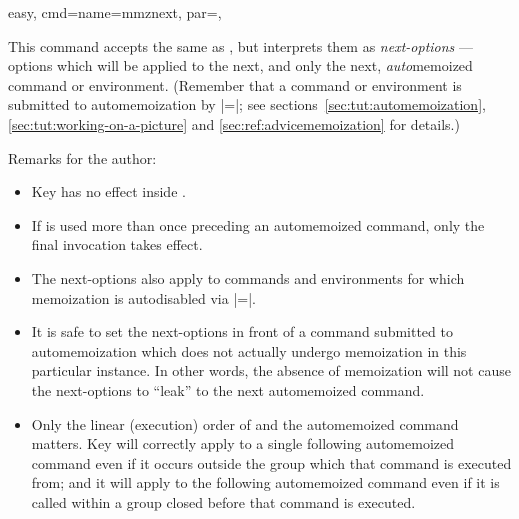 \documentclass[a4paper,11pt]{article}
\begin{document}
\begin{doc}{easy,
    cmd={name=mmznext, par=},
  }

  This command accepts the same  as , but
  interprets them as \emph{next-options} --- options which will be applied to
  the next, and only the next, \emph{auto}memoized command or environment.
  (Remember that a command or environment is submitted to automemoization by
  |=|; see
  sections~\ref{sec:tut:automemoization}, \ref{sec:tut:working-on-a-picture}
  and \ref{sec:ref:advicememoization} for details.)

  Remarks for the author:

  \begin{itemize}
  \item Key  has no effect inside .
  \item If  is used more than once preceding an automemoized
    command, only the final invocation takes effect.
  \item The next-options also apply to commands and environments for which
    memoization is autodisabled via |=|.
  \item It is safe to set the next-options in front of a command submitted to
    automemoization which does not actually undergo memoization in this
    particular instance.  In other words, the absence of memoization will not
    cause the next-options to ``leak'' to the next automemoized command.
  \item Only the linear (execution) order of  and the
    automemoized command matters.  Key  will correctly apply to
    a single following automemoized command even if it occurs outside the group
    which that command is executed from; and it will apply to the following
    automemoized command even if it is called within a group closed before that
    command is executed.
  \end{itemize}


\end{doc}
\end{document}
